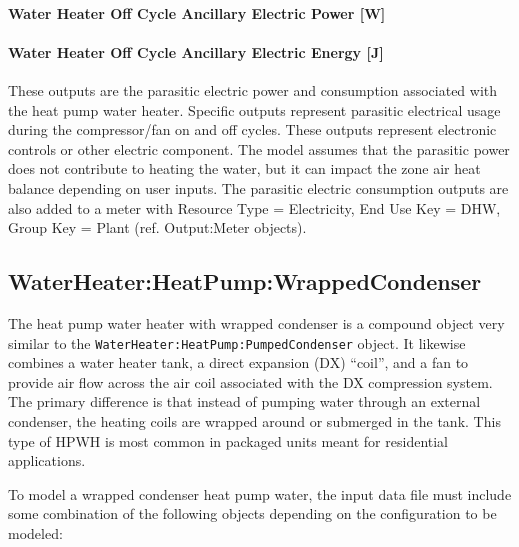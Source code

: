 \paragraph{Water Heater Off Cycle Ancillary Electric Power {[}W{]}}\label{water-heater-off-cycle-ancillary-electric-power-w}

\paragraph{Water Heater Off Cycle Ancillary Electric Energy {[}J{]}}\label{water-heater-off-cycle-ancillary-electric-energy-j}

These outputs are the parasitic electric power and consumption associated with the heat pump water heater. Specific outputs represent parasitic electrical usage during the compressor/fan on and off cycles. These outputs represent electronic controls or other electric component. The model assumes that the parasitic power does not contribute to heating the water, but it can impact the zone air heat balance depending on user inputs. The parasitic electric consumption outputs are also added to a meter with Resource Type = Electricity, End Use Key = DHW, Group Key = Plant (ref. Output:Meter objects).

\subsection{WaterHeater:HeatPump:WrappedCondenser}\label{waterheaterheatpumpwrappedcondenser}

The heat pump water heater with wrapped condenser is a compound object very similar to the \lstinline!WaterHeater:HeatPump:PumpedCondenser! object. It likewise combines a water heater tank, a direct expansion (DX) ``coil'', and a fan to provide air flow across the air coil associated with the DX compression system. The primary difference is that instead of pumping water through an external condenser, the heating coils are wrapped around or submerged in the tank. This type of HPWH is most common in packaged units meant for residential applications.

To model a wrapped condenser heat pump water, the input data file must include some combination of the following objects depending on the configuration to be modeled:

